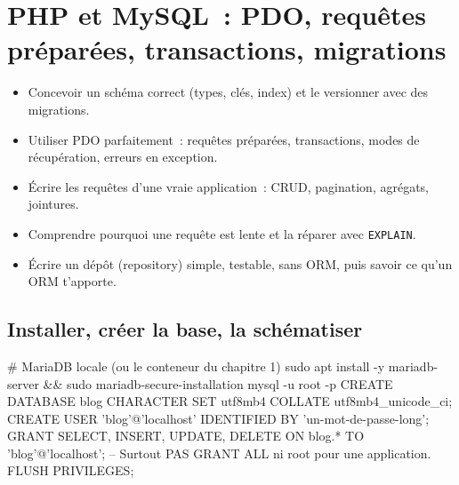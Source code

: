 \documentclass[12pt,a4paper,twoside,openright]{book}
\begin{document}
\chapter{PHP et MySQL~: PDO, requ\^etes pr\'epar\'ees, transactions, migrations}
\label{ch-php-db}

\begin{objectif}
\begin{itemize}
  \item Concevoir un sch\'ema correct (types, cl\'es, index) et le versionner avec des migrations.
  \item Utiliser PDO parfaitement~: requ\^etes pr\'epar\'ees, transactions, modes de r\'ecup\'eration,
        erreurs en exception.
  \item \'Ecrire les requ\^etes d'une vraie application~: CRUD, pagination, agr\'egats, jointures.
  \item Comprendre pourquoi une requ\^ete est lente et la r\'eparer avec \verb|EXPLAIN|.
  \item \'Ecrire un d\'ep\^ot (repository) simple, testable, sans ORM, puis savoir ce qu'un ORM t'apporte.
\end{itemize}
\end{objectif}

\section{Installer, cr\'eer la base, la sch\'ematiser}

\begin{terminal}
# MariaDB locale (ou le conteneur du chapitre 1)
sudo apt install -y mariadb-server && sudo mariadb-secure-installation
mysql -u root -p
CREATE DATABASE blog CHARACTER SET utf8mb4 COLLATE utf8mb4_unicode_ci;
CREATE USER 'blog'@'localhost' IDENTIFIED BY 'un-mot-de-passe-long';
GRANT SELECT, INSERT, UPDATE, DELETE ON blog.* TO 'blog'@'localhost';
-- Surtout PAS GRANT ALL ni root pour une application.
FLUSH PRIVILEGES;
\end{terminal}
\end{document}
